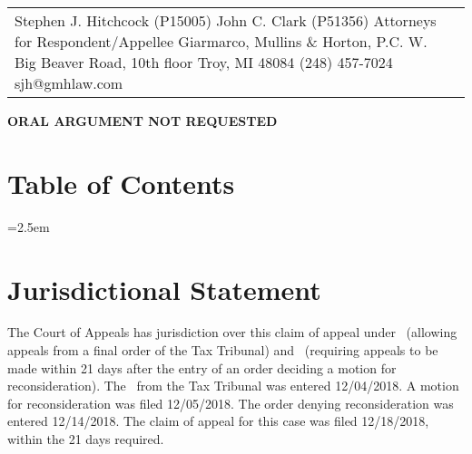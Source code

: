 \documentclass[12pt,\documentclassflag]{michiganCourtOfAppealsBrief}
\begin{document}
\begin{centering}
\begin{tabular}{p{} p{}}
{       Stephen J. Hitchcock (P15005)\newline%
       John C. Clark (P51356)\newline%
       Attorneys for Respondent/Appellee\newline%
       Giarmarco, Mullins \& Horton, P.C.\newline%
       101 W. Big Beaver Road, 10th floor\newline%
       Troy, MI 48084\newline%
       (248) 457-7024\newline%
       sjh@gmhlaw.com
  ~}
\end{tabular}
\makeandletter
\par\vspace{\baselineskip}\vspace{\baselineskip}\vspace{\baselineskip}
\textbf{ORAL ARGUMENT NOT REQUESTED}

\end{centering}

\pagestyle{romanparen}
\newpage 

\section*{Table of Contents}

\tableofcontents

\newpage
\tableofauthorities

\pagestyle{plain}



\parindent=2.5em
\doublespacing

\section{Jurisdictional Statement}
 
The Court of Appeals has jurisdiction over this claim of appeal under \cite{MCL 205.753(2)}\ (allowing appeals from a final order of the Tax Tribunal) and \cite{MCR 7.204(A)(1)(b)}\ (requiring appeals to be made within 21 days after the entry of an order deciding a motion for reconsideration). The \fojAbbr\ from the Tax Tribunal was entered 12/04/2018. A motion for reconsideration was filed 12/05/2018. The order denying reconsideration was entered 12/14/2018. The claim of appeal for this case was filed 12/18/2018, within the 21 days required.
\end{document}
